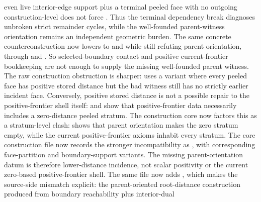 \documentclass[11pt]{article}
\begin{document}
\begin{itemize}
even live interior-edge support plus a terminal peeled face with no outgoing
construction-level  does not force
.  Thus the
terminal dependency break diagnoses unbroken strict remainder cycles, while the
well-founded parent-witness orientation remains an independent geometric
burden.  The same concrete counterconstruction now lowers to
 and
 while still
refuting parent orientation, through
and
.
So selected-boundary contact and positive current-frontier bookkeeping are not
enough to supply the missing well-founded parent witness.  The raw construction
obstruction is sharper:
uses a variant where every peeled face has positive stored distance but the bad
witness still has no strictly earlier incident face.  Conversely, positive
stored distance is not a possible repair to the positive-frontier shell itself:
and
show that positive-frontier data necessarily includes a zero-distance peeled
stratum.  The construction core now factors this as a stratum-level clash:
shows that parent orientation makes the zero stratum empty, while the current
positive-frontier axioms inhabit every stratum.  The core construction file now
records the stronger incompatibility as
,
with corresponding face-partition and boundary-support variants.  The missing
parent-orientation datum is therefore lower-distance incidence, not scalar
positivity or the current zero-based positive-frontier shell.  The same file now adds
,
which makes the source-side mismatch explicit: the parent-oriented root-distance
construction produced from boundary reachability plus interior-dual

\end{itemize}
\end{document}
